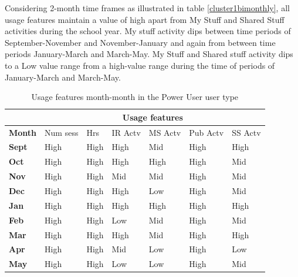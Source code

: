 \documentclass{acm_proc_article-sp}
\begin{document}
Considering 2-month time frames as illustrated in table \ref{cluster1bimonthly}, all usage features maintain a value of high apart from My Stuff and Shared Stuff activities during the school year. My stuff activity dips between time periods of September-November and November-January and again from between time periods January-March and March-May.
My Stuff and Shared stuff activity dips to a Low value range from a high-value range during the time of periods of January-March and March-May.


\begin{table}[htbp!]
\caption{Usage features month-month in the Power User user type}
\label{cluster1month}
\begin{tabular}{|p{1.5cm}|p{0.6cm}|p{0.6cm}|p{0.6cm}|p{0.6cm}|p{0.8cm}|p{0.8cm}|}
\hline
& \multicolumn{6}{c|}{\textbf{Usage features}}  \\ \hline
 \textbf{Month} 
 & Num sess & Hrs & IR Actv & MS Actv & Pub Actv & SS Actv \\ \hline
\textbf{Sept} & High                                   & High  & High        & Mid             & High           & High                \\ \hline
\textbf{Oct}   & High                                   & High  & High        & High            & High           & Mid                 \\ \hline
\textbf{Nov}  & High                                   & High  & Mid         & Mid             & High           & Mid                 \\ \hline
\textbf{Dec}  & High                                   & High  & High        & Low             & High           & Mid                 \\ \hline
\textbf{Jan}   & High                                   & High  & High        & High            & High           & High                \\ \hline
\textbf{Feb}  & High                                   & High  & Low         & Mid             & High           & Mid                 \\ \hline
\textbf{Mar}     & High                                   & High  & High        & Mid             & High           & High                \\ \hline
\textbf{Apr}     & High                                   & High  & Mid         & Low             & High           & Low                 \\ \hline
\textbf{May}       & High                                   & High  & Low         & Low             & High           & Mid         \\  \hline     
\end{tabular}
\end{table}
\end{document}
